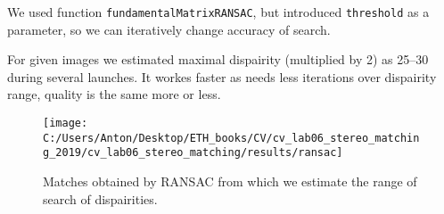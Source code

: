 \documentclass{report}
\begin{document}
We used function \texttt{fundamentalMatrixRANSAC}, but introduced \texttt{threshold} as a parameter, so we can iteratively change accuracy of search.

For given images we estimated maximal dispairity (multiplied by 2) as 25--30 during several launches. It workes faster as needs less iterations over dispairity range, quality is the same more or less.

\begin{figure}[h]
	\begin{center}
		\begin{minipage}[h]{0.95\linewidth}
			\texttt{[image: C:/Users/Anton/Desktop/ETH\_books/CV/cv\_lab06\_stereo\_matching\_2019/cv\_lab06\_stereo\_matching/results/ransac]}
		\end{minipage}
	\caption{Matches obtained by RANSAC from which we estimate the range of search of dispairities.}
	\end{center}
\end{figure}
\end{document}
